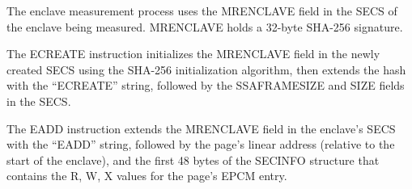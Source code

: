 
The enclave measurement process uses the MRENCLAVE field in the SECS of the
enclave being measured. MRENCLAVE holds a 32-byte SHA-256 signature.


The ECREATE instruction initializes the MRENCLAVE field in the newly created
SECS using the SHA-256 initialization algorithm, then extends the hash with
the ``ECREATE'' string, followed by the SSAFRAMESIZE and SIZE fields in the
SECS.

\begin{table}[hbt]
  \caption{
    Data extended into MRENCLAVE by the ECREATE instruction.
  }
  \label{fig:ecreate_mrenclave}
\end{table}


The EADD instruction extends the MRENCLAVE field in the enclave's SECS with the
``EADD'' string, followed by the page's linear address (relative to the start
of the enclave), and the first 48 bytes of the SECINFO structure that contains
the R, W, X values for the page's EPCM entry.

\begin{table}[hbt]
  \caption{
    Data extended into MRENCLAVE by the EADD instruction.
  }
  \label{fig:eadd_mrenclave}
\end{table}

